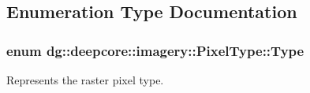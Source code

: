 \subsection{Enumeration Type Documentation}
\subsubsection[{\texorpdfstring{Type}{Type}}]{\setlength{\rightskip}{0pt plus 5cm}enum {\bf dg\+::deepcore\+::imagery\+::\+Pixel\+Type\+::\+Type}}\hypertarget{namespacedg_1_1deepcore_1_1imagery_1_1_pixel_type_a5f0c62edf4601cbd15e52b381697069d}{}\label{namespacedg_1_1deepcore_1_1imagery_1_1_pixel_type_a5f0c62edf4601cbd15e52b381697069d}


Represents the raster pixel type. 

